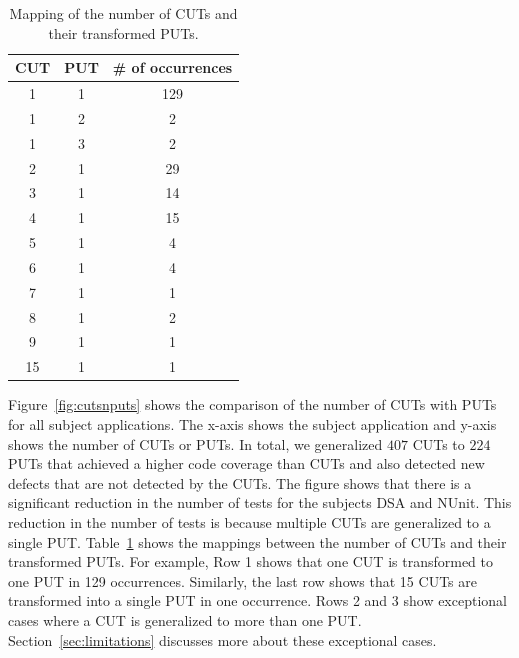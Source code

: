 \begin{table}[t]
\begin{CodeOut}
\begin{center}
\centering 
\begin {tabular} {|c|c|c|}
\hline \textbf{CUT} & \textbf{PUT} & \textbf{\# of occurrences}\\
\hline
\hline 1   & 1   & 129\\
\hline 1   & 2   & 2\\
\hline 1   & 3   & 2\\
\hline 2   & 1   & 29\\
\hline 3   & 1   & 14\\
\hline 4   & 1   & 15\\
\hline 5   & 1   & 4\\
\hline 6   & 1   & 4\\
\hline 7   & 1   & 1\\
\hline 8   & 1   & 2\\
\hline 9   & 1   & 1\\
\hline 15   & 1   & 1\\
\hline
\end{tabular}\vspace*{-2ex}
\caption {\label{tab:cutputmapping} Mapping of the number of CUTs and their transformed PUTs.} \vspace*{-5ex}
\end{center}
\end{CodeOut}
\end{table}

Figure~\ref{fig:cutsnputs} shows the comparison of the number of CUTs with PUTs for all subject applications. The x-axis shows the subject application and y-axis shows the number of CUTs or PUTs. In total, we generalized $407$ CUTs to $224$ PUTs that achieved a higher code coverage than CUTs and also detected new defects that are not detected by the CUTs. The figure shows that there is a significant reduction in the number of tests for the subjects DSA and NUnit. This reduction in the number of tests is because multiple CUTs are generalized to a single PUT. Table~\ref{tab:cutputmapping} shows the mappings between the number of CUTs and their transformed PUTs. For example, Row 1 shows that one CUT is transformed to one PUT in 129 occurrences. Similarly, the last row shows that 15 CUTs are transformed into a single PUT in one occurrence. Rows 2 and 3 show exceptional cases where a CUT is generalized to more than one PUT. Section~\ref{sec:limitations} discusses more about these exceptional cases. 

